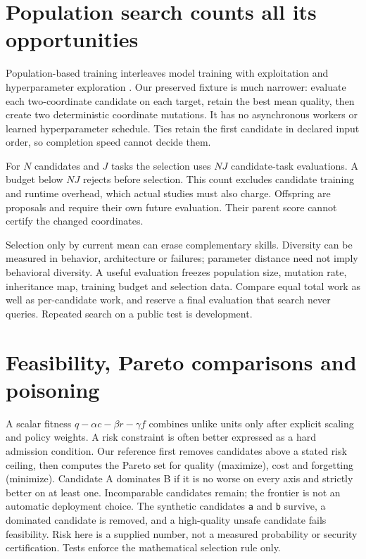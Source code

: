 \section{Population search counts all its opportunities}
Population-based training interleaves model training with exploitation and
hyperparameter exploration \cite{evod50:pbt}. Our preserved fixture is much
narrower: evaluate each two-coordinate candidate on each target, retain the
best mean quality, then create two deterministic coordinate mutations. It has
no asynchronous workers or learned hyperparameter schedule. Ties retain the
first candidate in declared input order, so completion speed cannot decide them.

For $N$ candidates and $J$ tasks the selection uses $NJ$ candidate-task
evaluations. A budget below $NJ$ rejects before selection. This count excludes
candidate training and runtime overhead, which actual studies must also charge.
Offspring are proposals and require their own future evaluation. Their parent
score cannot certify the changed coordinates.


Selection only by current mean can erase complementary skills. Diversity can
be measured in behavior, architecture or failures; parameter distance need not
imply behavioral diversity. A useful evaluation freezes population size,
mutation rate, inheritance map, training budget and selection data. Compare
equal total work as well as per-candidate work, and reserve a final evaluation
that search never queries. Repeated search on a public test is development.

\section{Feasibility, Pareto comparisons and poisoning}
A scalar fitness $q-\alpha c-\beta r-\gamma f$ combines unlike units only
after explicit scaling and policy weights. A risk constraint is often better
expressed as a hard admission condition. Our reference first removes candidates
above a stated risk ceiling, then computes the Pareto set for quality
(maximize), cost and forgetting (minimize). Candidate A dominates B if it is
no worse on every axis and strictly better on at least one. Incomparable
candidates remain; the frontier is not an automatic deployment choice.
The synthetic candidates \texttt{a} and \texttt{b} survive, a dominated
candidate is removed, and a high-quality unsafe candidate fails feasibility.
Risk here is a supplied number, not a measured probability or security
certification. Tests enforce the mathematical selection rule only.

